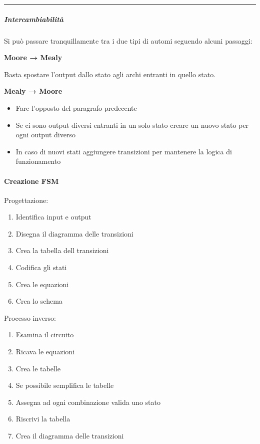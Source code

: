\documentclass{article}
\begin{document}
\noindent\rule{\textwidth}{0.5pt}

\subparagraph{Intercambiabilità}

Si può passare tranquillamente tra i due tipi di automi seguendo alcuni passaggi:\newline

\textbf{Moore → Mealy}

\vspace{5pt}

Basta spostare l'output dallo stato agli archi entranti in quello stato.\newline

\textbf{Mealy → Moore}

\begin{itemize}
    \item Fare l'opposto del paragrafo predecente
    \item Se ci sono output diversi entranti in un solo stato creare un nuovo stato per ogni output diverso
    \item In caso di nuovi stati aggiungere transizioni per mantenere la logica di funzionamento
\end{itemize}

\newpage

\paragraph{Creazione FSM}

Progettazione:
\begin{enumerate}
    \item Identifica input e output
    \item Disegna il diagramma delle transizioni
    \item Crea la tabella dell transizioni
    \item Codifica gli stati
    \item Crea le equazioni
    \item Crea lo schema
\end{enumerate}

Processo inverso:
\begin{enumerate}
    \item Esamina il circuito
    \item Ricava le equazioni
    \item Crea le tabelle
    \item Se possibile semplifica le tabelle
    \item Assegna ad ogni combinazione valida uno stato
    \item Riscrivi la tabella
    \item Crea il diagramma delle transizioni
\end{enumerate}
\end{document}
